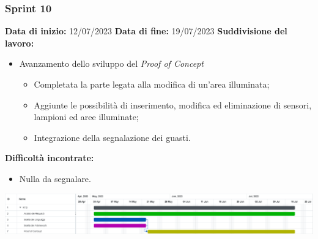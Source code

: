 \documentclass[a4paper, 12pt]{article}
\begin{document}
\subsubsection{Sprint 10}
\textbf{Data di inizio:} 12/07/2023\newline
\textbf{Data di fine:} 19/07/2023\newline
\newline
\textbf{Suddivisione del lavoro:}
\begin{itemize}
	\item Avanzamento dello sviluppo del \textit{Proof of Concept}
	      \begin{itemize}
		      \item Completata la parte legata alla modifica di un'area illuminata;
		      \item Aggiunte le possibilità di inserimento, modifica ed eliminazione
		            di sensori, lampioni ed aree illuminate;
		      \item Integrazione della segnalazione dei guasti.
	      \end{itemize}
\end{itemize}
\textbf{Difficoltà incontrate:}
\begin{itemize}
	\item Nulla da segnalare.
\end{itemize}
\includegraphics[scale=0.178]{RTB_9.png}\newline
\newline
\end{document}
